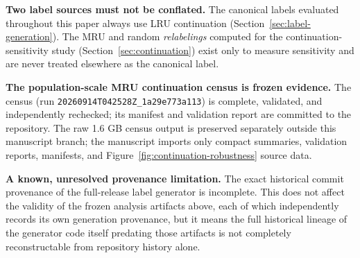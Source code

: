 \textbf{Two label sources must not be conflated.} The canonical labels
evaluated throughout this paper always use LRU continuation
(Section~\ref{sec:label-generation}). The MRU and random \emph{relabelings}
computed for the continuation-sensitivity study
(Section~\ref{sec:continuation}) exist only to measure sensitivity and are
never treated elsewhere as the canonical label.

\textbf{The population-scale MRU continuation census is frozen evidence.}
The census (run \texttt{20260914T042528Z\_1a29e773a113}) is complete,
validated, and independently rechecked; its manifest and validation report
are committed to the repository. The raw 1.6 GB census output is preserved
separately outside this
manuscript branch; the manuscript imports only compact summaries,
validation reports, manifests, and Figure~\ref{fig:continuation-robustness}
source data.

\textbf{A known, unresolved provenance limitation.} The exact historical
commit provenance of the full-release label generator is incomplete. This
does not affect the validity of the frozen analysis artifacts above, each
of which independently
records its own generation provenance, but it means the full historical
lineage of the generator code itself predating those artifacts is not
completely reconstructable from repository history alone.
